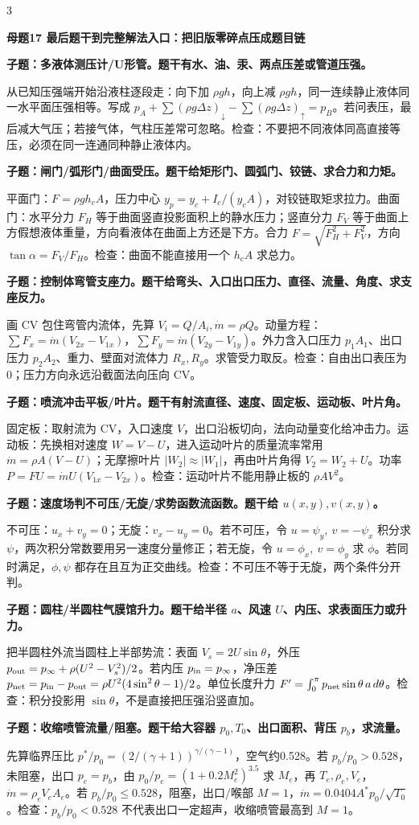 \documentclass[a4paper]{article}
\newcommand{\mt}[1]{\vspace{0.45pt}\colorbox{M}{\parbox{\dimexpr\linewidth-2\fboxsep}{\color{white}\bfseries #1}}\par}
\newcommand{\qt}[1]{\vspace{0.25pt}\colorbox{Q}{\parbox{\dimexpr\linewidth-2\fboxsep}{\color{white}\bfseries #1}}\par}
\newcommand{\ans}[1]{\colorbox{G}{\parbox{\dimexpr\linewidth-2\fboxsep}{#1}}\par}
\begin{document}
\begin{multicols}{3}
\mt{母题17 最后题干到完整解法入口：把旧版零碎点压成题目链}
\qt{子题：多液体测压计/U形管。题干有水、油、汞、两点压差或管道压强。}
\ans{从已知压强端开始沿液柱逐段走：向下加 $\rho gh$，向上减 $\rho gh$，同一连续静止液体同一水平面压强相等。写成 $p_A+\sum(\rho g\Delta z)_{\downarrow}-\sum(\rho g\Delta z)_{\uparrow}=p_B$。若问表压，最后减大气压；若接气体，气柱压差常可忽略。检查：不要把不同液体同高直接等压，必须在同一连通同种静止液体内。}
\qt{子题：闸门/弧形门/曲面受压。题干给矩形门、圆弧门、铰链、求合力和力矩。}
\ans{平面门：$F=\rho gh_cA$，压力中心 $y_p=y_c+I_c/(y_cA)$，对铰链取矩求拉力。曲面门：水平分力 $F_H$ 等于曲面竖直投影面积上的静水压力；竖直分力 $F_V$ 等于曲面上方假想液体重量，方向看液体在曲面上方还是下方。合力 $F=\sqrt{F_H^2+F_V^2}$，方向 $\tan\alpha=F_V/F_H$。检查：曲面不能直接用一个 $h_cA$ 求总力。}
\qt{子题：控制体弯管支座力。题干给弯头、入口出口压力、直径、流量、角度、求支座反力。}
\ans{画 CV 包住弯管内流体，先算 $V_i=Q/A_i,\dot m=\rho Q$。动量方程：$\sum F_x=\dot m(V_{2x}-V_{1x})$，$\sum F_y=\dot m(V_{2y}-V_{1y})$。外力含入口压力 $p_1A_1$、出口压力 $p_2A_2$、重力、壁面对流体力 $R_x,R_y$。求管受力取反。检查：自由出口表压为0；压力方向永远沿截面法向压向 CV。}
\qt{子题：喷流冲击平板/叶片。题干有射流直径、速度、固定板、运动板、叶片角。}
\ans{固定板：取射流为 CV，入口速度 $V$，出口沿板切向，法向动量变化给冲击力。运动板：先换相对速度 $W=V-U$，进入运动叶片的质量流率常用 $\dot m=\rho A(V-U)$；无摩擦叶片 $|W_2|\approx |W_1|$，再由叶片角得 $V_2=W_2+U$。功率 $P=FU=\dot mU(V_{1x}-V_{2x})$。检查：运动叶片不能用静止板的 $\rho AV^2$。}
\qt{子题：速度场判不可压/无旋/求势函数流函数。题干给 $u(x,y),v(x,y)$。}
\ans{不可压：$u_x+v_y=0$；无旋：$v_x-u_y=0$。若不可压，令 $u=\psi_y,\ v=-\psi_x$ 积分求 $\psi$，两次积分常数要用另一速度分量修正；若无旋，令 $u=\phi_x,\ v=\phi_y$ 求 $\phi$。若同时满足，$\phi,\psi$ 都存在且互为正交曲线。检查：不可压不等于无旋，两个条件分开判。}
\qt{子题：圆柱/半圆柱气膜馆升力。题干给半径 $a$、风速 $U$、内压、求表面压力或升力。}
\ans{把半圆柱外流当圆柱上半部势流：表面 $V_s=2U\sin\theta$，外压 $p_{\rm out}=p_\infty+\rho(U^2-V_s^2)/2$。若内压 $p_{\rm in}=p_\infty$，净压差 $p_{\rm net}=p_{\rm in}-p_{\rm out}=\rho U^2(4\sin^2\theta-1)/2$。单位长度升力 $F'=\int_0^\pi p_{\rm net}\sin\theta\,a\,d\theta$。检查：积分投影用 $\sin\theta$，不是直接把压强沿竖直加。}
\qt{子题：收缩喷管流量/阻塞。题干给大容器 $p_0,T_0$、出口面积、背压 $p_b$，求流量。}
\ans{先算临界压比 $p^*/p_0=(2/(\gamma+1))^{\gamma/(\gamma-1)}$，空气约0.528。若 $p_b/p_0>0.528$，未阻塞，出口 $p_e=p_b$，由 $p_0/p_e=(1+0.2M_e^2)^{3.5}$ 求 $M_e$，再 $T_e,\rho_e,V_e$，$\dot m=\rho_eV_eA_e$。若 $p_b/p_0\le0.528$，阻塞，出口/喉部 $M=1$，$\dot m=0.0404A^*p_0/\sqrt{T_0}$。检查：$p_b/p_0<0.528$ 不代表出口一定超声，收缩喷管最高到 $M=1$。}

\end{multicols}
\end{document}
